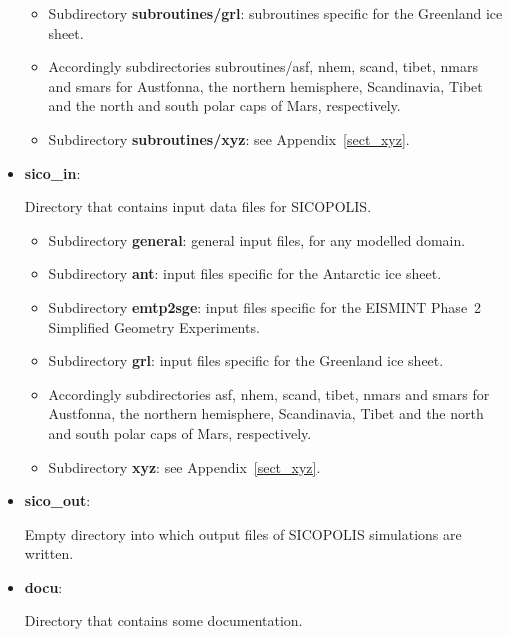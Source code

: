 \documentclass[12pt,a4paper]{article}
\begin{document}
\begin{itemize}
\begin{itemize}
\item
Subdirectory \textbf{subroutines/grl}: subroutines specific for the Greenland ice sheet.

\item
Accordingly subdirectories subroutines/asf, nhem, scand, tibet, nmars and smars for Austfonna, the northern hemisphere, Scandinavia, Tibet and the north and south polar caps of Mars, respectively.

\item
Subdirectory \textbf{subroutines/xyz}: see Appendix~\ref{sect_xyz}.

\end{itemize}

\item \textbf{sico\_in}:

Directory that contains input data files for SICOPOLIS.

\begin{itemize}

\item
Subdirectory \textbf{general}: general input files, for any modelled domain.

\item
Subdirectory \textbf{ant}: input files specific for the Antarctic ice sheet.

\item
Subdirectory \textbf{emtp2sge}: input files specific for the EISMINT Phase~2 Simplified Geometry Experiments.

\item
Subdirectory \textbf{grl}: input files specific for the Greenland ice sheet.

\item
Accordingly subdirectories asf, nhem, scand, tibet, nmars and smars for Austfonna, the northern hemisphere, Scandinavia, Tibet and the north and south polar caps of Mars, respectively.

\item
Subdirectory \textbf{xyz}: see Appendix~\ref{sect_xyz}.

\end{itemize}

\item \textbf{sico\_out}:

Empty directory into which output files of SICOPOLIS simulations are written.

\item \textbf{docu}:

Directory that contains some documentation.


\end{itemize}
\end{document}
